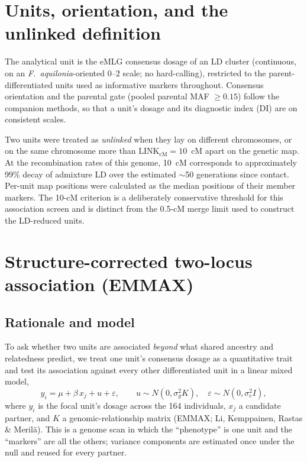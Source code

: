 \documentclass[11pt]{article}
\newcommand{\Faq}{\textit{F.~aquilonia}}
\begin{document}
\section{Units, orientation, and the unlinked definition}\label{sec:units}

The analytical unit is the eMLG consensus dosage of an LD cluster (continuous, on an
\Faq-oriented $0$--$2$ scale; no hard-calling), restricted to the parent-differentiated
units used as informative markers throughout. Consensus orientation and the parental gate
(pooled parental MAF $\geq0.15$) follow the companion methods, so that a unit's dosage and
its diagnostic index (DI) are on consistent scales.

Two units were treated as \emph{unlinked} when they lay on different chromosomes, or on the
same chromosome more than $\mathrm{LINK}_{\mathrm{cM}}=10$~cM apart on the genetic map.
At the recombination rates of this genome, 10~cM corresponds to approximately 99\% decay of
admixture LD over the estimated $\sim$50 generations since contact. Per-unit map positions
were calculated as the median positions of their member markers. The 10-cM criterion is a
deliberately conservative threshold for this association screen and is distinct from the
0.5-cM merge limit used to construct the LD-reduced units.

\section{Structure-corrected two-locus association (EMMAX)}\label{sec:emmax}

\subsection{Rationale and model}

To ask whether two units are associated \emph{beyond} what shared ancestry and relatedness
predict, we treat one unit's consensus dosage as a quantitative trait and test its
association against every other differentiated unit in a linear mixed model,
\begin{equation}
  y_i = \mu + \beta\,x_j + u + \varepsilon,\qquad
  u\sim N(0,\sigma_g^2 K),\quad \varepsilon\sim N(0,\sigma_e^2 I),
  \label{eq:emmax}
\end{equation}
where $y_i$ is the focal unit's dosage across the 164 individuals, $x_j$ a candidate
partner, and $K$ a genomic-relationship matrix (EMMAX; Li, Kemppainen, Rastas \& Meril\"a).
This is a genome scan in which the ``phenotype'' is one unit and the ``markers'' are all the
others; variance components are estimated once under the null and reused for every partner.
\end{document}

